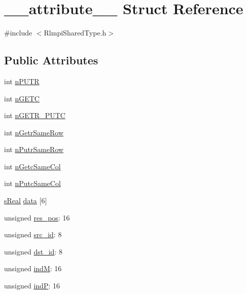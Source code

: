 \hypertarget{struct____attribute____}{
\section{\_\-\_\-attribute\_\-\_\- Struct Reference}
\label{struct____attribute____}
}


{\ttfamily \#include $<$RlmpiSharedType.h$>$}\subsection*{Public Attributes}
\begin{DoxyCompactItemize}
\item 
int \hyperlink{struct____attribute_____aca7a5080435e36e62172756495e61b3b}{nPUTR}
\item 
int \hyperlink{struct____attribute_____a308fce32ca5f5670acc3f8d2073ab32d}{nGETC}
\item 
int \hyperlink{struct____attribute_____a2d6aee77358153fff1c39b11895af6a2}{nGETR\_\-PUTC}
\item 
int \hyperlink{struct____attribute_____a24f192574d106edbf269fa991e5b857e}{nGetrSameRow}
\item 
int \hyperlink{struct____attribute_____ac39c8684fd7d72438a65c2a17976e3b3}{nPutrSameRow}
\item 
int \hyperlink{struct____attribute_____a236aeba42ccf5515e5e3d75a98fadfbb}{nGetcSameCol}
\item 
int \hyperlink{struct____attribute_____a73b0f642eca0d1cd54815fd381727332}{nPutcSameCol}
\item 
\hyperlink{RlmpiSharedType_8h_af4148c3e44f31072c9b97e63e56bbde3}{sReal} \hyperlink{struct____attribute_____acd2f8e99683824500bedfcabf34fd4f9}{data} \mbox{[}6\mbox{]}
\item 
unsigned \hyperlink{struct____attribute_____a5520bd158c9067709c4581ee299ffb68}{res\_\-pos}: 16
\item 
unsigned \hyperlink{struct____attribute_____ab5ad54f2c28857af1bdac6584a3a1968}{src\_\-id}: 8
\item 
unsigned \hyperlink{struct____attribute_____abffd4da5aef1ba4854e7a81d14f86864}{dst\_\-id}: 8
\item 
unsigned \hyperlink{struct____attribute_____a215d68d123f74d9c49d41e3f21cc84ed}{indM}: 16
\item 
unsigned \hyperlink{struct____attribute_____aebaa365507fa4ca28d858516a653e5a7}{indP}: 16
\end{DoxyCompactItemize}


